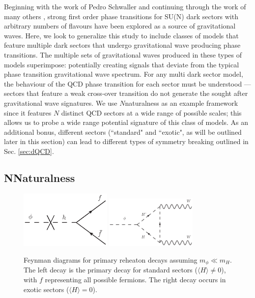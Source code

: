 \documentclass[nofootinbib,twocolumn,preprintnumbers]{revtex4-1}
\begin{document}
Beginning with the work of Pedro Schwaller \cite{Schwaller:2015tja} and continuing through the work of many others \cite{everyoneelse}, strong first order phase transitions for SU(N) dark sectors with arbitrary numbers of flavours have been explored as a source of gravitational waves. Here, we look to generalize this study to include classes of models that feature multiple dark sectors that undergo gravitational wave producing phase transitions. The multiple sets of gravitational waves produced in these types of models superimpose: potentially creating signals that deviate from the typical phase transition gravitational wave spectrum. For any multi dark sector model, the behaviour of the QCD phase transition for each sector must be understood --- sectors that feature a weak cross-over transition do not generate the sought after gravitational wave signatures. We use $N$naturalness as an example framework since it features $N$ distinct QCD sectors at a wide range of possible scales; this allows us to probe a wide range potential signature of this class of models. As an additional bonus, different sectors (``standard" and ``exotic", as will be outlined later in this section) can lead to different types of symmetry breaking outlined in Sec. \ref{sec:dQCD}.

\subsection{NNaturalness}

\begin{figure}[tb]
\centering
\begin{minipage}[c]{\textwidth}
\includegraphics[width=0.4\textwidth]{standardDecay.eps}
\includegraphics[width=0.4\textwidth]{exoticDecay.eps}
\end{minipage}
\hfill
\caption{Feynman diagrams for primary reheaton decays assuming $m_{\phi} \ll m_H$. The left decay is the primary decay for standard sectors ($\langle H\rangle\neq 0$), with $f$ representing all possible fermions. The right decay occurs in exotic sectors ($\langle H\rangle = 0$).
}
\label{fig:reheatonDecays}
\end{figure}
\end{document}
